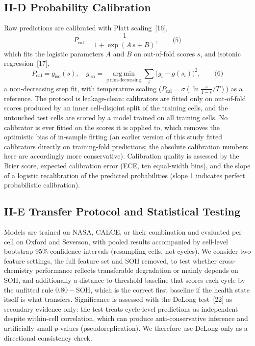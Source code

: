 \documentclass[conference]{IEEEtran}
\begin{document}
\subsection{II-D Probability Calibration}
Raw predictions are calibrated with Platt scaling~[16],
\begin{equation}
P_{\mathrm{cal}} = \frac{1}{1 + \exp(A\,s + B)},
\qquad \text{(5)}
\end{equation}
which fits the logistic parameters $A$ and $B$ on out-of-fold scores
$s$, and isotonic regression~[17],
\begin{equation}
P_{\mathrm{cal}} = g_{\mathrm{iso}}(s), \quad
g_{\mathrm{iso}} = \operatorname*{arg\,min}_{g\;\mathrm{non\mbox{-}decreasing}}
\textstyle\sum_i \bigl(y_i - g(s_i)\bigr)^2,
\qquad \text{(6)}
\end{equation}
a non-decreasing step fit, with temperature scaling ($P_{\mathrm{cal}}
= \sigma\!\left(\ln\tfrac{s}{1-s}\big/T\right)$) as a reference. The protocol is leakage-clean: calibrators are fitted only on
out-of-fold scores produced by an inner cell-disjoint split of the
training cells, and the untouched test cells are scored by a model
trained on all training cells. No calibrator is ever fitted on the
scores it is applied to, which removes the optimistic bias of in-sample
fitting (an earlier version of this study fitted calibrators directly
on training-fold predictions; the absolute calibration numbers here are
accordingly more conservative). Calibration quality
is assessed by the Brier score, expected calibration error (ECE, ten
equal-width bins), and the slope of a logistic recalibration of the
predicted probabilities (slope 1 indicates perfect probabilistic
calibration).

\subsection{II-E Transfer Protocol and Statistical Testing}
Models are trained on NASA, CALCE, or their combination and evaluated
per cell on Oxford and Severson, with pooled results accompanied by
cell-level bootstrap 95\% confidence intervals (resampling cells, not
cycles). We consider two feature settings, the full feature set and
SOH removed, to test whether cross-chemistry performance reflects
transferable degradation or mainly depends on SOH, and additionally a
distance-to-threshold baseline that scores each cycle by the unfitted
rule $0.80-\mathrm{SOH}$, which is the correct first baseline if the
health state itself is what transfers. Significance is assessed with
the DeLong test~[22] as secondary evidence only: the test
treats cycle-level predictions as independent despite within-cell
correlation, which can produce anti-conservative inference and
artificially small $p$-values (pseudoreplication). We therefore use
DeLong only as a directional consistency check.
\end{document}
